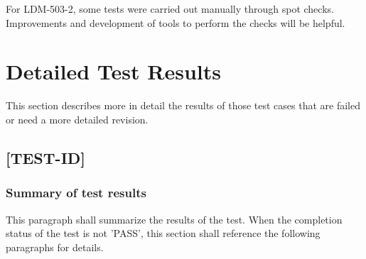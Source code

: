 \documentclass[DM,lsstdraft,STR,toc]{lsstdoc}
\begin{document}
For LDM-503-2, some tests were carried out manually through spot checks.
Improvements and development of tools to perform the checks will be helpful.


\newpage

\section{Detailed Test Results \label{sect:detailed}}
This section describes more in detail the results of those test cases that are failed or need a more detailed revision.
\subsection{[TEST-ID]}
\subsubsection{Summary of test results}
This paragraph shall summarize the results of the test. When the completion status of the test is not 'PASS', this section
shall reference the following paragraphs for details.
\end{document}
